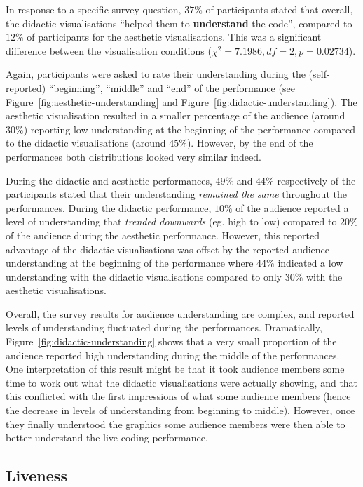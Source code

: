 In response to a specific survey question, $37\%$ of participants stated that overall, the didactic visualisations ``helped them to \textbf{understand} the code'', compared to $12\%$ of participants for the aesthetic visualisations. This was a significant difference between the visualisation conditions ($\chi^2=7.1986,df=2,p=0.02734$).

Again, participants were asked to rate their understanding during the (self-reported) ``beginning'', ``middle'' and ``end'' of the performance (see Figure~\ref{fig:aesthetic-understanding} and Figure~\ref{fig:didactic-understanding}). The aesthetic visualisation resulted in a smaller percentage of the audience (around $30\%$) reporting low understanding at the beginning of the performance compared to the didactic visualisations (around $45\%$). However, by the end of the performances both distributions looked very similar indeed.

During the didactic and aesthetic performances, $49\%$ and $44\%$ respectively of the participants stated that their understanding \emph{remained the same} throughout the performances. During the didactic performance, $10\%$ of the audience reported a level of understanding that \emph{trended downwards} (eg. high to low) compared to $20\%$ of the audience during the aesthetic performance. However, this reported advantage of the didactic visualisations was offset by the reported audience understanding at the beginning of the performance where $44\%$ indicated a low understanding with the didactic visualisations compared to only $30\%$ with the aesthetic visualisations. 

Overall, the survey results for audience understanding are complex, and reported levels of understanding fluctuated during the performances. Dramatically, Figure~\ref{fig:didactic-understanding} shows that a very small proportion of the audience reported high understanding during the middle of the performances. One interpretation of this result might be that it took audience members some time to work out what the didactic visualisations were actually showing, and that this conflicted with the first impressions of what some audience members (hence the decrease in levels of understanding from beginning to middle). However, once they finally understood the graphics some audience members were then able to better understand the live-coding performance.

\subsection{Liveness}
\label{section:liveness}

